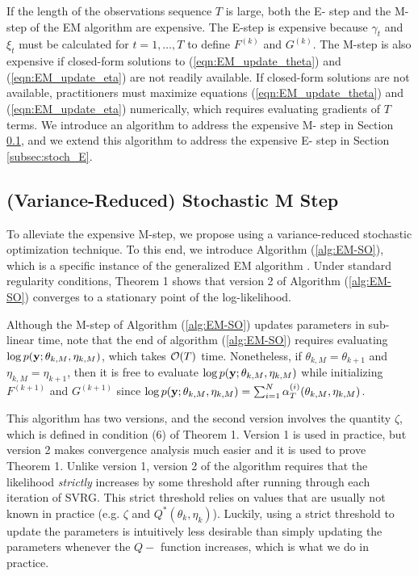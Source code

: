 
If the length of the observations sequence $T$ is large, both the E- step and the M- step of the EM algorithm are expensive. The E-step is expensive because $\gamma_t$ and $\xi_t$ must be calculated for $t = 1,\ldots,T$ to define $F^{(k)}$ and $G^{(k)}$. The M-step is also expensive if closed-form solutions to (\ref{eqn:EM_update_theta}) and (\ref{eqn:EM_update_eta}) are not readily available. If closed-form solutions are not available, practitioners must maximize equations (\ref{eqn:EM_update_theta}) and (\ref{eqn:EM_update_eta}) numerically, which requires evaluating gradients of $T$ terms. We introduce an algorithm to address the expensive M- step in Section \ref{subsec:stoch_M}, and we extend this algorithm to address the expensive E- step in Section \ref{subsec:stoch_E}.

\subsection{(Variance-Reduced) Stochastic M Step}
\label{subsec:stoch_M}

To alleviate the expensive M-step, we propose using a variance-reduced stochastic optimization technique. To this end, we introduce Algorithm (\ref{alg:EM-SO}), which is a specific instance of the generalized EM algorithm \citep{Dempster:1977}. Under standard regularity conditions, Theorem 1 shows that version 2 of Algorithm (\ref{alg:EM-SO}) converges to a stationary point of the log-likelihood.

Although the M-step of Algorithm (\ref{alg:EM-SO}) updates parameters in sub-linear time, note that the end of algorithm (\ref{alg:EM-SO}) requires evaluating $\log p(\mathbf{y};\theta_{k,M},\eta_{k,M})$, which takes $\mathcal{O}(T)$ time. Nonetheless, if $\theta_{k,M} = \theta_{k+1}$ and $\eta_{k,M} = \eta_{k+1}$, then it is free to evaluate $\log p(\mathbf{y};\theta_{k,M},\eta_{k,M})$ while initializing $F^{(k+1)}$ and $G^{(k+1)}$ since $\log p(\mathbf{y};\theta_{k,M},\eta_{k,M}) = \sum_{i=1}^N \alpha_T^{(i)}(\theta_{k,M},\eta_{k,M})$.

This algorithm has two versions, and the second version involves the quantity $\zeta$, which is defined in condition (6) of Theorem 1. Version 1 is used in practice, but version 2 makes convergence analysis much easier and it is used to prove Theorem 1. Unlike version 1, version 2 of the algorithm requires that the likelihood \textit{strictly} increases by some threshold after running through each iteration of SVRG. This strict threshold relies on values that are usually not known in practice (e.g. $\zeta$ and $Q^*(\theta_k,\eta_k)$). Luckily, using a strict threshold to update the parameters is intuitively less desirable than simply updating the parameters whenever the $Q-$ function increases, which is what we do in practice.

